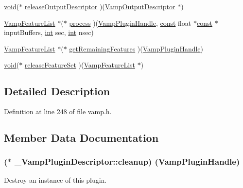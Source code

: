 \begin{DoxyCompactItemize}
\hyperlink{sound_8c_ae35f5844602719cf66324f4de2a658b3}{void}($\ast$ \hyperlink{struct___vamp_plugin_descriptor_a69f9fef2ed20a88985c960de4428cecb}{release\+Output\+Descriptor} )(\hyperlink{vamp_8h_aa8429dd9c60d65800c58574c2b06bf66}{Vamp\+Output\+Descriptor} $\ast$)
\item 
\hyperlink{vamp_8h_a5f257e3f8b5ca1ca4c159d486e219078}{Vamp\+Feature\+List} $\ast$($\ast$ \hyperlink{struct___vamp_plugin_descriptor_aff1c25291c967cb2f198b900e551a7eb}{process} )(\hyperlink{vamp_8h_ad3be2952b1f4ad7d775940a6db75c79b}{Vamp\+Plugin\+Handle}, \hyperlink{getopt1_8c_a2c212835823e3c54a8ab6d95c652660e}{const} float $\ast$\hyperlink{getopt1_8c_a2c212835823e3c54a8ab6d95c652660e}{const} $\ast$input\+Buffers, \hyperlink{xmltok_8h_a5a0d4a5641ce434f1d23533f2b2e6653}{int} sec, \hyperlink{xmltok_8h_a5a0d4a5641ce434f1d23533f2b2e6653}{int} nsec)
\item 
\hyperlink{vamp_8h_a5f257e3f8b5ca1ca4c159d486e219078}{Vamp\+Feature\+List} $\ast$($\ast$ \hyperlink{struct___vamp_plugin_descriptor_ad897b43458161a43cf6085198217d197}{get\+Remaining\+Features} )(\hyperlink{vamp_8h_ad3be2952b1f4ad7d775940a6db75c79b}{Vamp\+Plugin\+Handle})
\item 
\hyperlink{sound_8c_ae35f5844602719cf66324f4de2a658b3}{void}($\ast$ \hyperlink{struct___vamp_plugin_descriptor_ab4ed73ea986582ab1b7e6c44149a982a}{release\+Feature\+Set} )(\hyperlink{vamp_8h_a5f257e3f8b5ca1ca4c159d486e219078}{Vamp\+Feature\+List} $\ast$)
\end{DoxyCompactItemize}


\subsection{Detailed Description}


Definition at line 248 of file vamp.\+h.



\subsection{Member Data Documentation}
\subsubsection[{\texorpdfstring{cleanup}{cleanup}}]{($\ast$ \+\_\+\+Vamp\+Plugin\+Descriptor\+::cleanup) ({\bf Vamp\+Plugin\+Handle})}\hypertarget{struct___vamp_plugin_descriptor_a70974d8d28534c006af87c4470d12b69}{}\label{struct___vamp_plugin_descriptor_a70974d8d28534c006af87c4470d12b69}
Destroy an instance of this plugin. 

